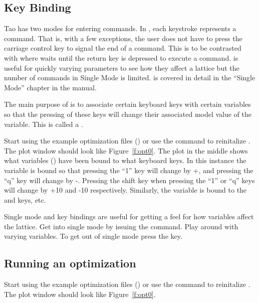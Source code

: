\documentclass{hitec}
\begin{document}
{\begin{code}
\begin{code}
\subsection{Key Binding}
\label{s:opt.run}

Tao has two modes for entering commands. In , each keystroke represents a
command. That is, with a few exceptions, the user does not have to press the carriage control key to
signal the end of a command. This is to be contrasted with  where \tao waits until
the return key is depressed to execute a command.  is useful for quickly varying
parameters to see how they affect a lattice but the number of commands in Single Mode is limited.
 is covered in detail in the ``Single Mode'' chapter in the \tao manual.

The main purpose of  is to associate certain keyboard keys with certain variables so that
the pressing of these keys will change their associated model value of the variable. This is called
a .

Start \tao using the example optimization files () or use the 
command to reinitalize \tao. The plot window should look like Figure~\ref{f:opt0}. The
 plot in the middle shows what variables () have been bound to what keyboard
keys. In this instance the  variable is bound so that pressing the ``1'' key will change
 by +, and pressing the ``q'' key will change  by -.
Pressing the shift key when pressing the ``1'' or ``q'' keys will change  by
+10 and -10 respectively. Similarly, the  variable is bound
to the  and  keys, etc. 

Single mode and key bindings are useful for getting a feel for how variables affect the lattice. Get
into single mode by issuing the  command. Play around with varying variables. To
get out of single mode press the  key.

\subsection{Running an optimization}
\label{s:opt.run}

Start \tao using the example optimization files () or use the 
command to reinitalize \tao. The plot window should look like Figure~\ref{f:opt0}. 


\end{code}
\end{code}}
\end{document}
